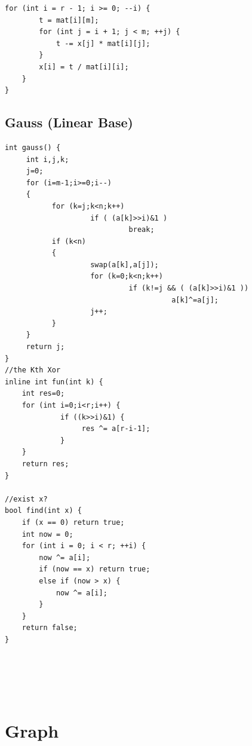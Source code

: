 \documentclass[twocolumn]{article}
\begin{document}
\begin{twocolumn}
\begin{lstlisting}[language={[ANSI]C}]
    for (int i = r - 1; i >= 0; --i) {
        t = mat[i][m];
        for (int j = i + 1; j < m; ++j) {
            t -= x[j] * mat[i][j];
        }
        x[i] = t / mat[i][i];
    }
}
\end{lstlisting}

\subsection{Gauss (Linear Base)}
\begin{lstlisting}[language={[ANSI]C}]
int gauss() {
     int i,j,k;
     j=0;
     for (i=m-1;i>=0;i--)
     {
           for (k=j;k<n;k++)
                    if ( (a[k]>>i)&1 )
                             break;
           if (k<n)
           {
                    swap(a[k],a[j]);
                    for (k=0;k<n;k++)
                             if (k!=j && ( (a[k]>>i)&1 ))
                                       a[k]^=a[j];
                    j++;
           }
     }
     return j;
}
//the Kth Xor
inline int fun(int k) {
    int res=0;
    for (int i=0;i<r;i++) {
             if ((k>>i)&1) {
                  res ^= a[r-i-1];
             }
    }
    return res;
}

//exist x?
bool find(int x) {
    if (x == 0) return true;
    int now = 0;
    for (int i = 0; i < r; ++i) {
        now ^= a[i];
        if (now == x) return true;
        else if (now > x) {
            now ^= a[i];
        }
    }
    return false;
}
\end{lstlisting}
\begin{lstlisting}[language={[ANSI]C}]
\end{lstlisting}
\begin{lstlisting}[language={[ANSI]C}]
\end{lstlisting}
\begin{lstlisting}[language={[ANSI]C}]
\end{lstlisting}
\begin{lstlisting}[language={[ANSI]C}]
\end{lstlisting}
\begin{lstlisting}[language={[ANSI]C}]
\end{lstlisting}
\begin{lstlisting}[language={[ANSI]C}]
\end{lstlisting}
\newpage

\section{Graph}


\end{twocolumn}
\end{document}
